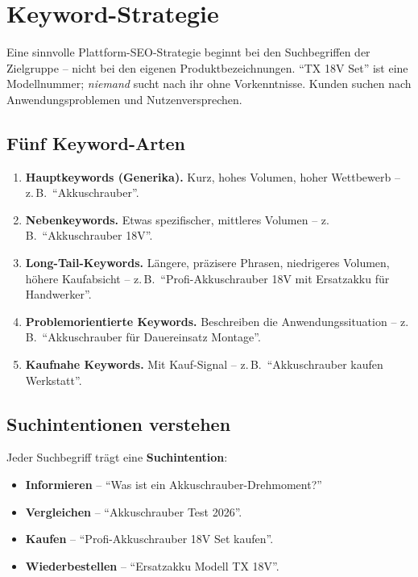 \documentclass[11pt,a4paper,oneside]{article}
\newcommand{\fachbegriff}[1]{\textbf{#1}}
\begin{document}
\section{Keyword-Strategie}

Eine sinnvolle Plattform-SEO-Strategie beginnt bei den Suchbegriffen der Zielgruppe -- nicht bei den eigenen Produktbezeichnungen. ``TX 18V Set'' ist eine Modellnummer; \emph{niemand} sucht nach ihr ohne Vorkenntnisse. Kunden suchen nach Anwendungsproblemen und Nutzenversprechen.

\subsection{Fünf Keyword-Arten}

\begin{enumerate}
  \item \fachbegriff{Hauptkeywords (Generika).} Kurz, hohes Volumen, hoher Wettbewerb -- z.\,B.\ ``Akkuschrauber''.
  \item \fachbegriff{Nebenkeywords.} Etwas spezifischer, mittleres Volumen -- z.\,B.\ ``Akkuschrauber 18V''.
  \item \fachbegriff{Long-Tail-Keywords.} Längere, präzisere Phrasen, niedrigeres Volumen, höhere Kaufabsicht -- z.\,B.\ ``Profi-Akkuschrauber 18V mit Ersatzakku für Handwerker''.
  \item \fachbegriff{Problemorientierte Keywords.} Beschreiben die Anwendungssituation -- z.\,B.\ ``Akkuschrauber für Dauereinsatz Montage''.
  \item \fachbegriff{Kaufnahe Keywords.} Mit Kauf-Signal -- z.\,B.\ ``Akkuschrauber kaufen Werkstatt''.
\end{enumerate}

\subsection{Suchintentionen verstehen}

Jeder Suchbegriff trägt eine \fachbegriff{Suchintention}:

\begin{itemize}
  \item \textbf{Informieren} -- ``Was ist ein Akkuschrauber-Drehmoment?''
  \item \textbf{Vergleichen} -- ``Akkuschrauber Test 2026''.
  \item \textbf{Kaufen} -- ``Profi-Akkuschrauber 18V Set kaufen''.
  \item \textbf{Wiederbestellen} -- ``Ersatzakku Modell TX 18V''.
\end{itemize}
\end{document}
